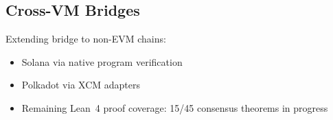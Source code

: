 \subsection{Cross-VM Bridges}

Extending bridge to non-EVM chains:
\begin{itemize}[leftmargin=1.1em]
  \item Solana via native program verification
  \item Polkadot via XCM adapters
  \item Remaining Lean~4 proof coverage: 15/45 consensus theorems in progress
\end{itemize}

